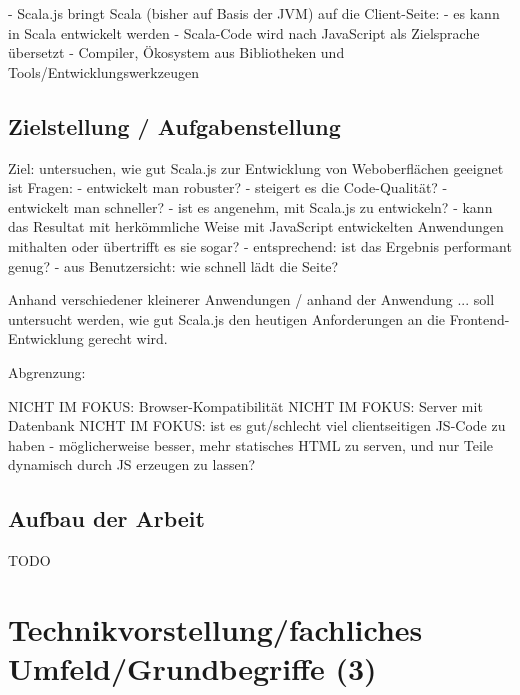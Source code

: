 \documentclass[a4paper, 12pt, hidelinks, listof=totoc, listoftables=totoc, bibliography=totoc]{scrreprt}
\begin{document}
- Scala.js bringt Scala (bisher auf Basis der JVM) auf die Client-Seite:
  - es kann in Scala entwickelt werden
  - Scala-Code wird nach JavaScript als Zielsprache übersetzt
  - Compiler, Ökosystem aus Bibliotheken und Tools/Entwicklungswerkzeugen



\section{Zielstellung / Aufgabenstellung}

Ziel: untersuchen, wie gut Scala.js zur Entwicklung von Weboberflächen geeignet ist
Fragen:
  - entwickelt man robuster?
  - steigert es die Code-Qualität?
  - entwickelt man schneller?
  - ist es angenehm, mit Scala.js zu entwickeln?
  - kann das Resultat mit herkömmliche Weise mit JavaScript entwickelten Anwendungen mithalten oder übertrifft es sie sogar?
  - entsprechend: ist das Ergebnis performant genug?
  - aus Benutzersicht: wie schnell lädt die Seite?

Anhand verschiedener kleinerer Anwendungen / anhand der Anwendung ... soll untersucht werden, wie gut Scala.js den heutigen Anforderungen an die Frontend-Entwicklung gerecht wird.


Abgrenzung:

	NICHT IM FOKUS: Browser-Kompatibilität
	NICHT IM FOKUS: Server mit Datenbank
	NICHT IM FOKUS:  ist es gut/schlecht viel clientseitigen JS-Code zu haben - möglicherweise besser, mehr statisches HTML zu serven, und nur Teile dynamisch durch JS erzeugen zu lassen?


\section{Aufbau der Arbeit}

TODO






















\chapter{Technikvorstellung/fachliches Umfeld/Grundbegriffe (3)}
\end{document}
